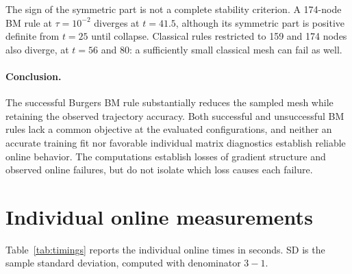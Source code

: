 \documentclass[a4paper,12pt]{article}
\begin{document}
The sign of the symmetric part is not a complete stability criterion. A 174-node BM rule at $\tau=10^{-2}$ diverges at $t=41.5$, although its symmetric part is positive definite from $t=25$ until collapse. Classical rules restricted to 159 and 174 nodes also diverge, at $t=56$ and $80$: a sufficiently small classical mesh can fail as well.

\paragraph{Conclusion.}
The successful Burgers BM rule substantially reduces the sampled mesh while retaining the observed trajectory accuracy. Both successful and unsuccessful BM rules lack a common objective at the evaluated configurations, and neither an accurate training fit nor favorable individual matrix diagnostics establish reliable online behavior. The computations establish losses of gradient structure and observed online failures, but do not isolate which loss causes each failure.

\clearpage
\section{Individual online measurements}
\label{sec:repeated-measurements}

Table~\ref{tab:timings} reports the individual online times in seconds. SD is the sample standard deviation, computed with denominator $3-1$.

\begin{table}[H]
 \centering\footnotesize
 \setlength{\tabcolsep}{4pt}
 \caption{Individual online wall-clock times (seconds) for HPROM (ECSW) and HPROM (BM-ECSW) at the three unsampled parameter points. Each measurement uses a fresh process and 20 CPU threads.}
 \label{tab:timings}
 
\end{table}

\begin{table}[H]
 \centering\small
 \caption{Fresh production HDM integration times: one run at each queried parameter, 20 CPU threads, and 500 time steps. The last row is the arithmetic mean over the three parameters.}
 \label{tab:fom-timings}
 
\end{table}
\end{document}
